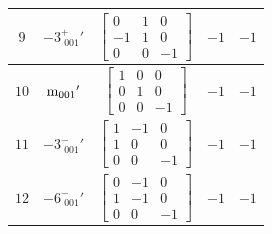 \documentclass[fleqn,8pt]{jsarticle}
\begin{document}
\begin{longtable}{ccccc}
$ 9 $ & $ -3^{+}_{\,\,001}{}' $ & $ \begin{bmatrix} 0 & 1 & 0 \\ -1 & 1 & 0 \\ 0 & 0 & -1 \end{bmatrix} $ & $ -1 $ & $ -1 $ \\ \hline
$ 10 $ & $ {\rm m}_{001}{}' $ & $ \begin{bmatrix} 1 & 0 & 0 \\ 0 & 1 & 0 \\ 0 & 0 & -1 \end{bmatrix} $ & $ -1 $ & $ -1 $ \\ \hline
$ 11 $ & $ -3^{-}_{\,\,001}{}' $ & $ \begin{bmatrix} 1 & -1 & 0 \\ 1 & 0 & 0 \\ 0 & 0 & -1 \end{bmatrix} $ & $ -1 $ & $ -1 $ \\ \hline
$ 12 $ & $ -6^{-}_{\,\,001}{}' $ & $ \begin{bmatrix} 0 & -1 & 0 \\ 1 & -1 & 0 \\ 0 & 0 & -1 \end{bmatrix} $ & $ -1 $ & $ -1 $ \\
\end{longtable}
\end{document}

